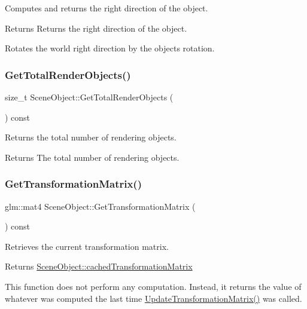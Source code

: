 Computes and returns the right direction of the object. 

\begin{DoxyReturn}{Returns}
Returns the right direction of the object.
\end{DoxyReturn}
Rotates the world right direction by the object\textquotesingle{}s rotation. \hypertarget{class_scene_object_a34f3e11a64d5879def4105b50d853ad1}{}\label{class_scene_object_a34f3e11a64d5879def4105b50d853ad1} 
\subsubsection{\texorpdfstring{Get\+Total\+Render\+Objects()}{GetTotalRenderObjects()}}
{\footnotesize\ttfamily size\+\_\+t Scene\+Object\+::\+Get\+Total\+Render\+Objects (\begin{DoxyParamCaption}{ }\end{DoxyParamCaption}) const\hspace{0.3cm}{\ttfamily [inline]}}



Returns the total number of rendering objects. 

\begin{DoxyReturn}{Returns}
The total number of rendering objects. 
\end{DoxyReturn}
\hypertarget{class_scene_object_afbb67229fa9895d9e4a9322e64ea4a66}{}\label{class_scene_object_afbb67229fa9895d9e4a9322e64ea4a66} 
\subsubsection{\texorpdfstring{Get\+Transformation\+Matrix()}{GetTransformationMatrix()}}
{\footnotesize\ttfamily glm\+::mat4 Scene\+Object\+::\+Get\+Transformation\+Matrix (\begin{DoxyParamCaption}{ }\end{DoxyParamCaption}) const\hspace{0.3cm}{\ttfamily [virtual]}}



Retrieves the current transformation matrix. 

\begin{DoxyReturn}{Returns}
\hyperlink{class_scene_object_aac3f13eea8a7b455e8cffc6eceef211c}{Scene\+Object\+::cached\+Transformation\+Matrix}
\end{DoxyReturn}
This function does not perform any computation. Instead, it returns the value of whatever was computed the last time \hyperlink{class_scene_object_a20e31da3f9d2765de50cdb2d637ae6c9}{Update\+Transformation\+Matrix()} was called. \hypertarget{class_scene_object_a88091d7fdb126137d4018738cd30f3d8}{}\label{class_scene_object_a88091d7fdb126137d4018738cd30f3d8} 
